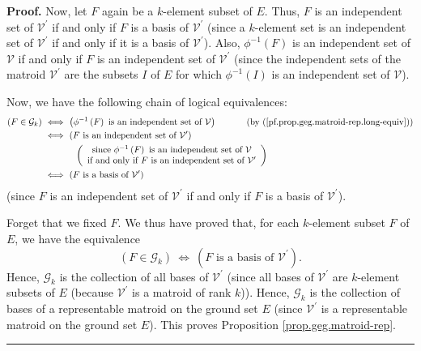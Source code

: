 \documentclass[numbers=enddot,12pt,final,onecolumn,notitlepage]{scrartcl}%
\theoremstyle{definition}
\newenvironment{proof}[1][Proof]{\noindent\textbf{#1.} }{\ \rule{0.5em}{0.5em}}
\theoremstyle{plainsl}
\begin{document}
\begin{proof}
Now, let $F$ again be a $k$-element subset of $E$. Thus, $F$ is an independent
set of $\mathcal{V}^{\prime}$ if and only if $F$ is a basis of $\mathcal{V}%
^{\prime}$ (since a $k$-element set is an independent set of $\mathcal{V}%
^{\prime}$ if and only if it is a basis of $\mathcal{V}^{\prime}$). Also,
$\phi^{-1}\left(  F\right)  $ is an independent set of $\mathcal{V}$ if and
only if $F$ is an independent set of $\mathcal{V}^{\prime}$ (since the
independent sets of the matroid $\mathcal{V}^{\prime}$ are the subsets $I$ of
$E$ for which $\phi^{-1}\left(  I\right)  $ is an independent set of
$\mathcal{V}$).

Now, we have the following chain of logical equivalences:%
\begin{align*}
\left(  F\in\mathcal{G}_{k}\right)  \  &  \Longleftrightarrow\ \left(
\phi^{-1}\left(  F\right)  \text{ is an independent set of }\mathcal{V}%
\right)  \ \ \ \ \ \ \ \ \ \ \left(  \text{by
(\ref{pf.prop.geg.matroid-rep.long-equiv})}\right) \\
&  \Longleftrightarrow\ \left(  F\text{ is an independent set of }%
\mathcal{V}^{\prime}\right) \\
&  \ \ \ \ \ \ \ \ \ \ \left(
\begin{array}
[c]{c}%
\text{since }\phi^{-1}\left(  F\right)  \text{ is an independent set of
}\mathcal{V}\\
\text{if and only if }F\text{ is an independent set of }\mathcal{V}^{\prime}%
\end{array}
\right) \\
&  \Longleftrightarrow\ \left(  F\text{ is a basis of }\mathcal{V}^{\prime
}\right)
\end{align*}
(since $F$ is an independent set of $\mathcal{V}^{\prime}$ if and only if $F$
is a basis of $\mathcal{V}^{\prime}$).

Forget that we fixed $F$. We thus have proved that, for each $k$-element
subset $F$ of $E$, we have the equivalence%
\[
\left(  F\in\mathcal{G}_{k}\right)  \ \Longleftrightarrow\ \left(  F\text{ is
a basis of }\mathcal{V}^{\prime}\right)  .
\]
Hence, $\mathcal{G}_{k}$ is the collection of all bases of $\mathcal{V}%
^{\prime}$ (since all bases of $\mathcal{V}^{\prime}$ are $k$-element subsets
of $E$ (because $\mathcal{V}^{\prime}$ is a matroid of rank $k$)). Hence,
$\mathcal{G}_{k}$ is the collection of bases of a representable matroid on the
ground set $E$ (since $\mathcal{V}^{\prime}$ is a representable matroid on the
ground set $E$). This proves Proposition \ref{prop.geg.matroid-rep}.
\end{proof}
\end{document}
